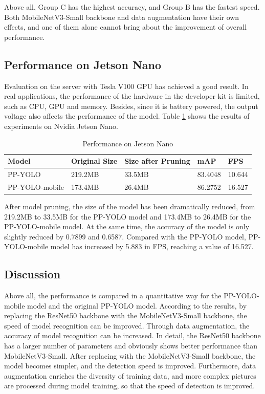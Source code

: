 \documentclass[sensors,article,submit,moreauthors,pdftex]{Definitions/mdpi}
\begin{document}
\begin{paracol}{2}
Above all, Group C has the highest accuracy, and Group B has the fastest speed. Both MobileNetV3-Small backbone and data augmentation have their own effects, and one of them alone cannot bring about the improvement of overall performance.


\subsection{Performance on Jetson Nano}
Evaluation on the server with Tesla V100 GPU has achieved a good result. In real applications, the performance of the hardware in the developer kit is limited, such as CPU, GPU and memory. Besides, since it is battery powered, the output voltage also affects the performance of the model. Table \ref{tbl:performance on Jetson Nano} shows the results of experiments on Nvidia Jetson Nano.


\begin{table}[H]
\centering
\caption{Performance on Jetson Nano}
\begin{tabular}{lllll} 
\toprule
\textbf{Model}&\textbf{Original Size}&\textbf{Size after Pruning}&\textbf{mAP}&\textbf{FPS}\\
\midrule
PP-YOLO  & 219.2MB&33.5MB&83.4048&10.644\\
PP-YOLO-mobile &173.4MB & 26.4MB&86.2752&16.527\\
\bottomrule
\end{tabular}
\label{tbl:performance on Jetson Nano}
\end{table}


After model pruning, the size of the model has been dramatically reduced, from 219.2MB to 33.5MB for the PP-YOLO model and 173.4MB to 26.4MB for the PP-YOLO-mobile model. At the same time, the accuracy of the model is only slightly reduced by 0.7899 and 0.6587. Compared with the PP-YOLO model, PP-YOLO-mobile model has increased by 5.883 in FPS, reaching a value of 16.527.



\subsection{Discussion}
Above all, the performance is compared in a quantitative way for the PP-YOLO-mobile model and the original PP-YOLO model. According to the results, by replacing the ResNet50 backbone with the MobileNetV3-Small backbone, the speed of model recognition can be improved. Through data augmentation, the accuracy of model recognition can be increased. In detail, the ResNet50 backbone has a larger number of parameters and obviously shows better performance than MobileNetV3-Small. After replacing with the MobileNetV3-Small backbone, the model becomes simpler, and the detection speed is improved. Furthermore, data augmentation enriches the diversity of training data, and more complex pictures are processed during model training, so that the speed of detection is improved.


\end{paracol}
\end{document}
